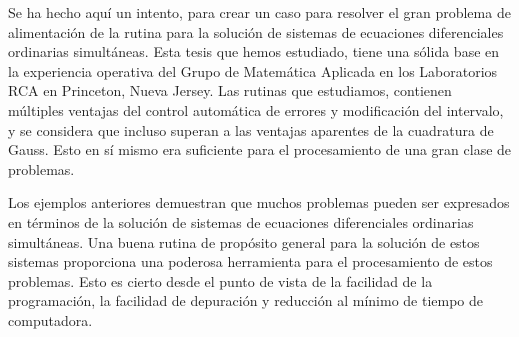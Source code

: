 Se ha hecho aquí un intento, para crear un caso para resolver el gran problema de alimentación
de la rutina para la solución de sistemas de ecuaciones diferenciales ordinarias simultáneas.
 Esta tesis que hemos estudiado, tiene una sólida base en la experiencia
operativa del Grupo de Matemática Aplicada en los Laboratorios RCA en Princeton, Nueva Jersey.
Las rutinas que estudiamos, contienen múltiples ventajas del control
automática de errores y modificación del intervalo, y se considera
que incluso superan a las ventajas aparentes de la cuadratura de Gauss.
 Esto en sí mismo era suficiente para el procesamiento de una gran clase de
problemas.

Los ejemplos anteriores demuestran que muchos problemas pueden ser expresados en términos de la solución
de sistemas de ecuaciones diferenciales ordinarias simultáneas. Una buena rutina de propósito general
para la solución de estos sistemas proporciona una poderosa herramienta para el procesamiento de estos
problemas. Esto es cierto desde el punto de vista de la facilidad de la programación, la facilidad de
depuración y reducción al mínimo de tiempo de computadora.
